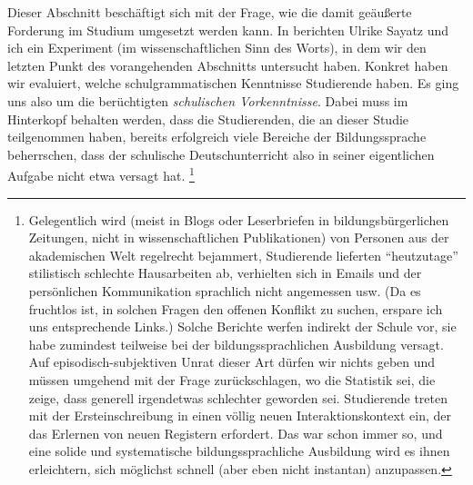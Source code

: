Dieser Abschnitt beschäftigt sich mit der Frage, wie die damit geäußerte Forderung im Studium umgesetzt werden kann.
In \citet{SchaeferSayatz2017a} berichten Ulrike Sayatz und ich ein Experiment (im wissenschaftlichen Sinn des Worts), in dem wir den letzten Punkt des vorangehenden Abschnitts untersucht haben.
Konkret haben wir evaluiert, welche schulgrammatischen Kenntnisse Studierende haben.
Es ging uns also um die berüchtigten \textit{schulischen Vorkenntnisse}.
Dabei muss im Hinterkopf behalten werden, dass die Studierenden, die an dieser Studie teilgenommen haben, bereits erfolgreich viele Bereiche der Bildungssprache beherrschen, dass der schulische Deutschunterricht also in seiner eigentlichen Aufgabe nicht etwa versagt hat.%
\footnote{Gelegentlich wird (meist in Blogs oder Leserbriefen in bildungsbürgerlichen Zeitungen, nicht in wissenschaftlichen Publikationen) von Personen aus der akademischen Welt regelrecht bejammert, Studierende lieferten "`heutzutage"' stilistisch schlechte Hausarbeiten ab, verhielten sich in Emails und der persönlichen Kommunikation sprachlich nicht angemessen usw.
(Da es fruchtlos ist, in solchen Fragen den offenen Konflikt zu suchen, erspare ich uns entsprechende Links.)
Solche Berichte werfen indirekt der Schule vor, sie habe zumindest teilweise bei der bildungssprachlichen Ausbildung versagt.
Auf episodisch-subjektiven Unrat dieser Art dürfen wir nichts geben und müssen umgehend mit der Frage zurückschlagen, wo die Statistik sei, die zeige, dass generell irgendetwas schlechter geworden sei.
Studierende treten mit der Ersteinschreibung in einen völlig neuen Interaktionskontext ein, der das Erlernen von neuen Registern erfordert.
Das war schon immer so, und eine solide und systematische bildungssprachliche Ausbildung wird es ihnen erleichtern, sich möglichst schnell (aber eben nicht instantan) anzupassen.}

